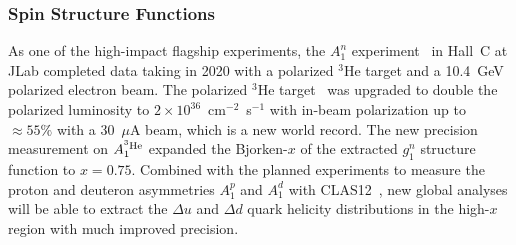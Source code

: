 \iffalse
\begin{figure}[t]
\centering
\texttt{[image: Figures/du\_data.pdf]}
\texttt{[image: Figures/spinPDF.pdf]}
\vspace*{-0.2cm}
\caption{{\color{blue} [UPDATE?]} (left) $d/u$ PDF ratio from the CJ15 analysis~\cite{Accardi:2016qay} (red band), illustrating the effects of nuclear corrections in deuteron DIS data (green band) and removing deuterium data altogether (hashed).
(right) Helicity PDFs for various quark flavors from the JAM15~\cite{Sato:2016tuz} Monte Carlo analysis of inclusive DIS data, using SU(3) symmetry constraints (blue bands), and the updated JAM17~\cite{Ethier:2017zbq} analysis of inclusive and semi-inclusive DIS without SU(3) constraints.}
\label{f.donu}
\end{figure}
\fi

\subsubsection*{Spin Structure Functions}
\label{sec:spinstrfunct}

As one of the high-impact flagship experiments, the $A_1^n$ experiment~\cite{A1n12GeV} in Hall~C at JLab completed data taking in 2020 with a polarized $^3$He target and a 10.4~GeV polarized electron beam. 
The polarized $^3$He target~\cite{polHe3} was upgraded to double the polarized luminosity to $2 \times 10^{36}$~cm$^{-2}$~s$^{-1}$ with in-beam polarization up to $\approx 55\%$ with a 30~$\mu$A beam, which is a new world record.
The new precision measurement on $A_1^{^3{\rm He}}$ expanded the Bjorken-$x$ of the extracted $g_1^n$ structure function to $x=0.75$.
Combined with the planned experiments to measure the proton and deuteron asymmetries $A_1^p$ and $A_1^d$ with CLAS12~\cite{CLAS12spin}, new global analyses will be able to extract the $\Delta u$ and $\Delta d$ quark helicity distributions in the high-$x$ region with much improved precision. 

\iffalse
\begin{figure}[t]
\begin{center}
\texttt{[image: Figures/spinPDF.pdf]}
\caption{{\color{blue} [UPDATE?]} Helicity PDFs for various quark flavors from the JAM15~\cite{Sato:2016tuz} Monte Carlo analysis of inclusive DIS data, using SU(3) symmetry constraints (blue bands), and the updated JAM17~\cite{Ethier:2017zbq} analysis of inclusive and semi-inclusive DIS without SU(3) constraints.}
\label{f.spdf}
\end{center}
\end{figure}
\fi

